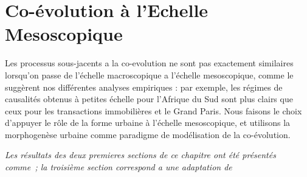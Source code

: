 

\chapter{Co-évolution à l'Echelle Mesoscopique}


\label{ch:mesocoevolution} 




Les processus sous-jacents a la co-evolution ne sont pas exactement similaires lorsqu'on passe de l'échelle macroscopique a l'échelle mesoscopique, comme le suggèrent nos différentes analyses empiriques : par exemple, les régimes de causalités obtenus à petites échelle pour l'Afrique du Sud sont plus clairs que ceux pour les transactions immobilières et le Grand Paris. Nous faisons le choix d'appuyer le rôle de la forme urbaine à l'échelle mesoscopique, et utilisons la morphogenèse urbaine comme paradigme de modélisation de la co-évolution.





















\stars


\textit{Les résultats des deux premieres sections de ce chapitre ont été présentés comme~\cite{}; la troisième section correspond a une adaptation de \cite{}}






